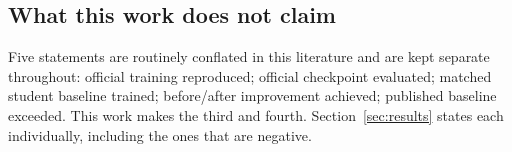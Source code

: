 \subsection{What this work does not claim}

Five statements are routinely conflated in this literature and are kept separate throughout:
official training reproduced; official checkpoint evaluated; matched student baseline trained;
before/after improvement achieved; published baseline exceeded. This work makes the third and
fourth. Section~\ref{sec:results} states each individually, including the ones that are negative.
